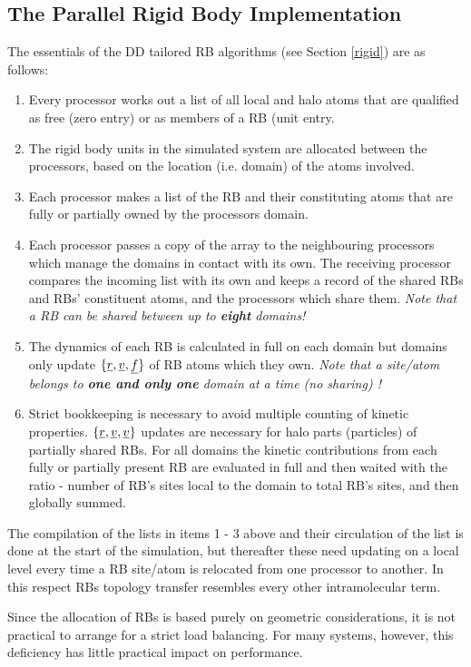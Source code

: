 \subsection{The Parallel Rigid Body Implementation}

The essentials of the DD tailored RB algorithms (see Section
\ref{rigid}) are as follows:
\begin{enumerate}
\item Every processor works out a list of all local and halo atoms
that are qualified as free (zero entry) or as members of a RB
(unit entry.
\item The rigid body units in the simulated system are allocated
between the processors, based on the location (i.e. domain) of
the atoms involved.
\item Each processor makes a list of the RB and their constituting
atoms that are fully or partially owned by the processors domain.
\item Each processor passes a copy of the array to the neighbouring
processors which manage the domains in contact with its own.
The receiving processor compares the incoming list with its own and
keeps a record of the shared RBs and RBs' constituent atoms, and
the processors which share them. {\em Note that a RB can be shared
between up to {\bf eight} domains!}
\item The dynamics of each RB is calculated in full on each domain
but domains only update $\{\mbox{$\underline{r}$},\mbox{$\underline{v}$},\mbox{$\underline{f}$}\}$ of RB atoms which
they own.  {\em Note that a site/atom belongs to {\bf one and
only one} domain at a time (no sharing) !}
\item Strict bookkeeping is necessary to avoid multiple counting of
kinetic properties.  $\{\mbox{$\underline{r}$},\mbox{$\underline{v}$},\mbox{$\underline{v}$}\}$ updates are
necessary for halo parts (particles) of partially shared RBs.  For
all domains the kinetic contributions from each fully or partially
present RB are evaluated in full and then waited with the ratio -
number of RB's sites local to the domain to total RB's sites, and
then globally summed.
\end{enumerate}

The compilation of the lists in items 1 - 3 above and their
circulation of the list is done at the start of the simulation,
but thereafter these need updating on a local level every time
a RB site/atom is relocated from one processor to another.  In this
respect RBs topology transfer resembles every other intramolecular term.

Since the allocation of RBs is based purely on geometric
considerations, it is not practical to arrange for a strict load
balancing.  For many systems, however, this deficiency has little
practical impact on performance.
